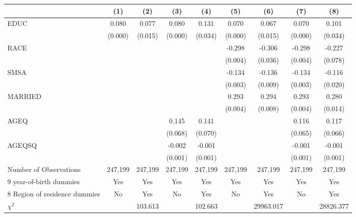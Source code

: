 {
\def\sym#1{\ifmmode^{#1}\else\(^{#1}\)\fi}
\begin{tabular}{l*{8}{c}}
\hline\hline
                    &\multicolumn{1}{c}{(1)}&\multicolumn{1}{c}{(2)}&\multicolumn{1}{c}{(3)}&\multicolumn{1}{c}{(4)}&\multicolumn{1}{c}{(5)}&\multicolumn{1}{c}{(6)}&\multicolumn{1}{c}{(7)}&\multicolumn{1}{c}{(8)}\\
\hline
EDUC                &       0.080&       0.077&       0.080&       0.131&       0.070&       0.067&       0.070&       0.101\\
                    &     (0.000)&     (0.015)&     (0.000)&     (0.034)&     (0.000)&     (0.015)&     (0.000)&     (0.034)\\
RACE                &            &            &            &            &      -0.298&      -0.306&      -0.298&      -0.227\\
                    &            &            &            &            &     (0.004)&     (0.036)&     (0.004)&     (0.078)\\
SMSA                &            &            &            &            &      -0.134&      -0.136&      -0.134&      -0.116\\
                    &            &            &            &            &     (0.003)&     (0.009)&     (0.003)&     (0.020)\\
MARRIED             &            &            &            &            &       0.293&       0.294&       0.293&       0.280\\
                    &            &            &            &            &     (0.004)&     (0.008)&     (0.004)&     (0.014)\\
AGEQ                &            &            &       0.145&       0.141&            &            &       0.116&       0.117\\
                    &            &            &     (0.068)&     (0.070)&            &            &     (0.065)&     (0.066)\\
AGEQSQ              &            &            &      -0.002&      -0.001&            &            &      -0.001&      -0.001\\
                    &            &            &     (0.001)&     (0.001)&            &            &     (0.001)&     (0.001)\\
\hline
Number of Observations&     247,199&     247,199&     247,199&     247,199&     247,199&     247,199&     247,199&     247,199\\
9 year-of-birth dummies&         Yes&         Yes&         Yes&         Yes&         Yes&         Yes&         Yes&         Yes\\
8 Region of residence dummies&          No&         Yes&          No&         Yes&          No&         Yes&          No&         Yes\\
$\chi^2$            &            &     103.613&            &     102.663&            &   29963.017&            &   28826.377\\
\hline\hline
\end{tabular}
}
